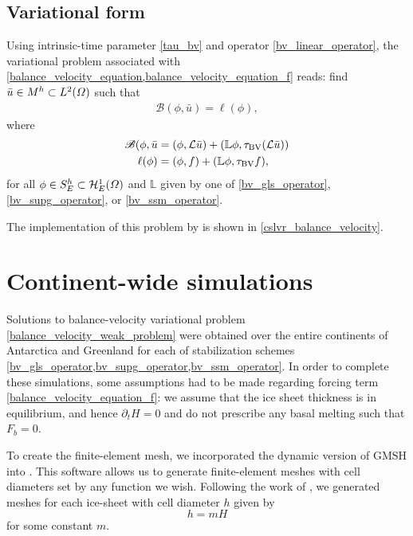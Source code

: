 \subsection{Variational form}

Using intrinsic-time parameter \cref{tau_bv} and operator \cref{bv_linear_operator}, the variational problem associated with \cref{balance_velocity_equation,balance_velocity_equation_f} reads: find $\bar{u} \in M^h \subset L^2(\varOmega)$ such that
\begin{align}
  \label{balance_velocity_weak_problem}
  \mathscr{B}(\phi, \bar{u}) = \ell(\phi),
\end{align}
where
\begin{align*}
  \mathscr{B}(\phi, \bar{u} &= (\phi, \mathcal{L} \bar{u}) + (\mathbb{L} \phi, \tau_{\text{BV}}(\mathcal{L}\bar{u})) \\
  \ell(\phi) &= (\phi, f) + (\mathbb{L} \phi, \tau_{\text{BV}}f),
\end{align*}
for all $\phi \in S_E^h \subset \mathcal{H}_E^1(\varOmega)$ and $\mathbb{L}$ given by one of \cref{bv_gls_operator}, \cref{bv_supg_operator}, or \cref{bv_ssm_operator}.

The implementation of this problem by \CSLVR is shown in \cref{cslvr_balance_velocity}.


\section{Continent-wide simulations} \label{ssn_balance_velocity_simulations}

Solutions to balance-velocity variational problem \cref{balance_velocity_weak_problem} were obtained over the entire continents of Antarctica and Greenland for each of stabilization schemes \cref{bv_gls_operator,bv_supg_operator,bv_ssm_operator}.
In order to complete these simulations, some assumptions had to be made regarding forcing term \cref{balance_velocity_equation_f}: we assume that the ice sheet thickness is in equilibrium, and hence $\partial_t H = 0$ and do not prescribe any basal melting such that $F_b = 0$.

To create the finite-element mesh, we incorporated the dynamic version of GMSH \citep{geuzaine_2009} into \CSLVR.  This software allows us to generate finite-element meshes with cell diameters set by any function we wish.  Following the work of \citet{brinkerhoff_2015}, we generated meshes for each ice-sheet with cell diameter $h$ given by 
$$h = mH$$
for some constant $m$.

